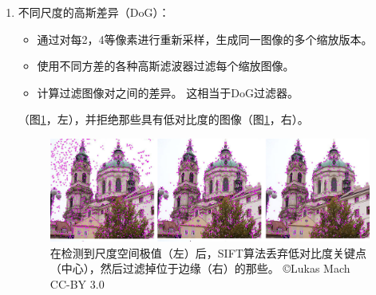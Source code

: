 \begin{enumerate}
\item 不同尺度的高斯差异（DoG）：

\begin{itemize}

\item 通过对每2，4等像素进行重新采样，生成同一图像的多个缩放版本。
\item 使用不同方差的各种高斯滤波器过滤每个缩放图像。
\item 计算过滤图像对之间的差异。 这相当于DoG过滤器。
\end{itemize}


（图\ref{fig:siftrejection}，左），并拒绝那些具有低对比度的图像（图\ref{fig:siftrejection}，右）。

\begin{figure}
	\centering
		\includegraphics[width=\textwidth]{figs/siftrejection.png}
	\caption{在检测到尺度空间极值（左）后，SIFT算法丢弃低对比度关键点（中心），然后过滤掉位于边缘（右）的那些。 \copyright Lukas Mach CC-BY 3.0}
	\label{fig:siftrejection}
\end{figure}


\end{enumerate}
